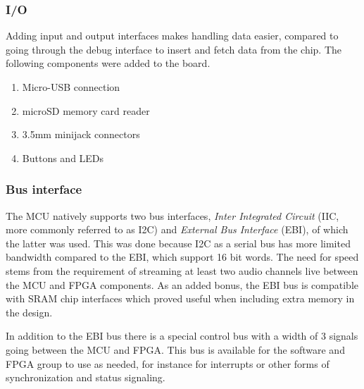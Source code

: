 \subsubsection{I/O}

Adding input and output interfaces makes handling data easier, compared to going
through the debug interface to insert and fetch data from the chip. The
following components were added to the board.

\begin{enumerate}
	\item Micro-USB connection
	\item microSD memory card reader
	\item 3.5mm minijack connectors
	\item Buttons and LEDs
\end{enumerate}

\subsubsection{Bus interface}

The MCU natively supports two bus interfaces, \textit{Inter Integrated Circuit}
(IIC, more commonly referred to as I2C) and \textit{External Bus Interface} (EBI), of which
the latter was used. This was done because I2C as a serial bus has more limited
bandwidth compared to the EBI, which support 16 bit words. The need for speed
stems from the requirement of streaming at least two audio channels live between
the MCU and FPGA components. As an added bonus, the EBI bus is compatible with
SRAM chip interfaces which proved useful when including extra memory in the
design.

In addition to the EBI bus there is a special control bus with a width of 3
signals going between the MCU and FPGA. This bus is available for the software
and FPGA group to use as needed, for instance for interrupts or other forms of
synchronization and status signaling.
